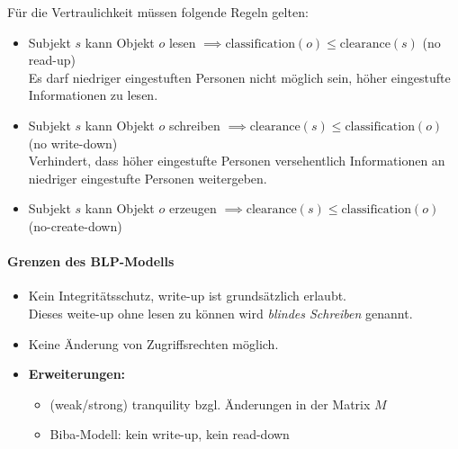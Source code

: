 	                Für die Vertraulichkeit müssen folgende Regeln gelten:
	                \begin{itemize}
	                	\item Subjekt \(s\) kann Objekt \(o\) lesen     \tabto{6cm} \( \implies \text{classification}(o) \leq \text{clearance}(s) \) (no read-up) \\ Es darf niedriger eingestuften Personen nicht möglich sein, höher eingestufte Informationen zu lesen.
	                	\item Subjekt \(s\) kann Objekt \(o\) schreiben \tabto{6cm} \( \implies \text{clearance}(s) \leq \text{classification}(o) \) (no write-down) \\ Verhindert, dass höher eingestufte Personen versehentlich Informationen an niedriger eingestufte Personen weitergeben.
	                	\item Subjekt \(s\) kann Objekt \(o\) erzeugen  \tabto{6cm} \( \implies \text{clearance}(s) \leq \text{classification}(o) \) (no-create-down)
	                \end{itemize}
                
                \paragraph{Grenzen des BLP-Modells}
		            \begin{itemize}
		            	\item Kein Integritätsschutz, write-up ist grundsätzlich erlaubt. \\ Dieses weite-up ohne lesen zu können wird \textit{blindes Schreiben} genannt.
		            	\item Keine Änderung von Zugriffsrechten möglich.
		            	\item \textbf{Erweiterungen:}
			            	\begin{itemize}
				            	\item (weak/strong) tranquility bzgl. Änderungen in der Matrix \(M\)
			            		\item Biba-Modell: kein write-up, kein read-down
			            	\end{itemize}
		            \end{itemize}

